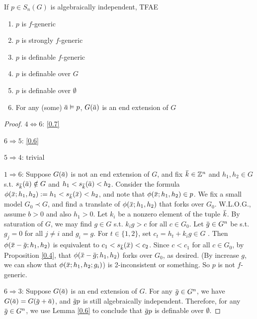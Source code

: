 \documentclass[11pt]{article}
\begin{document}
\begin{theorem}[]
\label{0.10}
If \(p\in S_n(G)\) is algebraically independent, TFAE
\begin{enumerate}
\item \(p\) is \(f\)-generic
\item \(p\) is strongly \(f\)-generic
\item \(p\) is definable \(f\)-generic
\item \(p\) is definable over \(G\)
\item \(p\) is definable over \(\emptyset\)
\item For any (some) \(\bara\vDash p\), \(G(\bara)\) is an end extension of \(G\)
\end{enumerate}
\end{theorem}

\begin{proof}
\(4\Leftrightarrow 6\): \ref{0.7}

\(6\Rightarrow 5\): \ref{0.6}

\(5\Rightarrow 4\): trivial

\(1\Rightarrow 6\): Suppose \(G(\bara)\) is not an end extension of \(G\), and fix \(\bark\in\Z^n\)
and \(h_1,h_2\in G\) s.t. \(s_{\bark}(\bara)\notin G\) and \(h_1<s_{\bark}(\bara)<h_2\). Consider the
formula \(\phi(\barx;h_1,h_2):=h_1<s_{\bark}(\barx)<h_2\), and note that \(\phi(\barx;h_1,h_2)\in p\). We fix
a small model \(G_0\prec G\), and find a translate of \(\phi(\barx;h_1,h_2)\) that forks over \(G_0\).
W.L.O.G., assume \(b>0\) and also \(h_1>0\). Let \(k_i\) be a nonzero element of the
tuple \(\bark\). By saturation of \(G\), we may find \(g\in G\) s.t. \(k_ig>c\) for all \(c\in G_0\).
Let \(\barg\in G^n\) be s.t. \(g_j=0\) for all \(j\neq i\) and \(g_i=g\). For \(t\in\{1,2\}\),
set \(c_t=h_t+k_ig\in G\) . Then \(\phi(\barx-\barg;h_1,h_2)\) is equivalent
to \(c_1<s_{\bark}(\barx)<c_2\). Since \(c<c_1\) for all \(c\in G_0\), by Proposition \ref{0.4},
that \(\phi(\barx-\barg;h_1,h_2)\) forks over \(G_0\), as desired. (By increase \(g\), we can show
that \(\phi(\barx;h_1,h_2;g_i)\)) is 2-inconsistent or something.
So \(p\) is not \(f\)-generic.

\(6\Rightarrow 3\): Suppose \(G(\bara)\) is an end extension of \(G\). For any \(\barg\in G^n\), we
have \(G(\bara)=G(\barg+\bara)\), and \(\barg p\) is still algebraically independent. Therefore,
for any \(\barg\in G^n\), we use Lemma \ref{0.6} to conclude that \(\barg p\) is definable over \(\emptyset\).
\end{proof}
\end{document}
